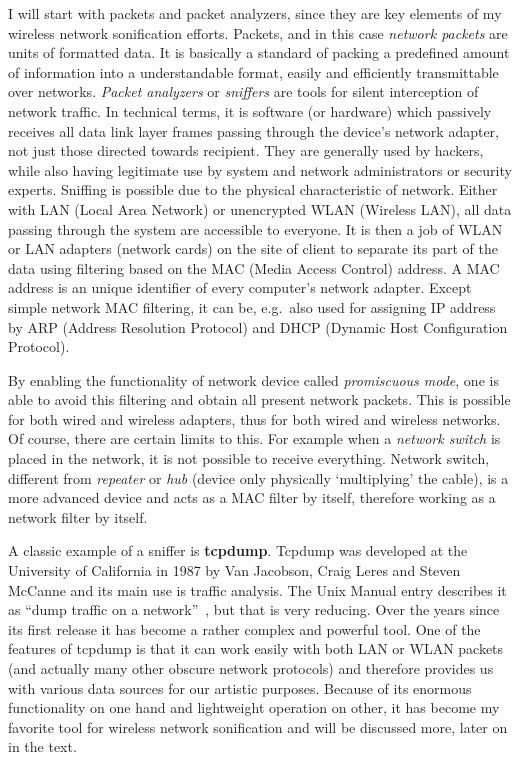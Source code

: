 \documentclass[12pt,a4paper,oneside]{report}
\begin{document}
I will start with packets and packet analyzers, since they are key elements of my wireless network sonification efforts. Packets, and in this case \emph{network packets} are units of formatted data. It is basically a standard of packing a predefined amount of information into a understandable format, easily and efficiently transmittable over networks. \emph{Packet analyzers} or \emph{sniffers} are tools for silent interception of network traffic. In technical terms, it is software (or hardware) which passively receives all data link layer frames passing through the device’s network adapter, not just those directed towards recipient. They are generally used by hackers, while also having legitimate use by system and network administrators or security experts. Sniffing is possible due to the physical characteristic of network. Either with LAN (Local Area Network) or unencrypted WLAN (Wireless LAN), all data passing through the system are accessible to everyone. It is then a job of WLAN or LAN adapters (network cards) on the site of client to separate its part of the data using filtering based on the MAC (Media Access Control) address. A MAC address is an unique identifier of every computer's network adapter. Except simple network MAC filtering, it can be, e.g.\, also used for assigning IP address by ARP (Address Resolution Protocol) and DHCP (Dynamic Host Configuration Protocol).

By enabling the functionality of network device called \emph{promiscuous mode}, one is able to avoid this filtering and obtain all present network packets. This is possible  for both wired and wireless adapters, thus for both wired and wireless networks. Of course, there are certain limits to this. For example when a \emph{network switch} is placed in the network, it is not possible to receive everything. Network switch, different from \emph{repeater} or \emph{hub} (device only physically `multiplying' the cable), is a more advanced device and acts as a MAC filter by itself, therefore working as a network filter by itself.~\cite{Pallavi2012}

A classic example of a sniffer is \textbf{tcpdump}. Tcpdump was developed at the University of California in 1987 by Van Jacobson, Craig Leres and Steven McCanne and its main use is traffic analysis. The Unix Manual entry describes it as ``dump traffic on a network''~\cite{tcpdump}, but that is very reducing. Over the years since its first release it has become a rather complex and powerful tool. One of the features of tcpdump is that it can work easily with both LAN or WLAN packets (and actually many other obscure network protocols) and therefore provides us with various data sources for our artistic purposes. Because of its enormous functionality on one hand and lightweight operation on other, it has become my favorite tool for wireless network sonification and will be discussed more, later on in the text.
\end{document}
